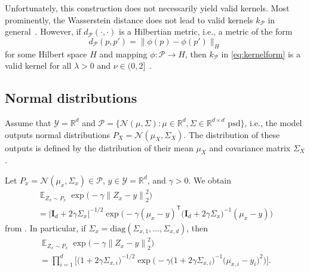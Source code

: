 \documentclass{article}
\DeclareMathOperator{\Exp}{\mathbb{E}}
\begin{document}
Unfortunately, this construction does not necessarily yield valid kernels.
Most prominently, the Wasserstein distance does not lead to valid kernels $k_{\mathcal{P}}$ in general~\citep[Chapter~8.3]{Peyre2018}. However, if $d_{\mathcal{P}}(\cdot, \cdot)$
is a Hilbertian metric, i.e., a metric of the form
\begin{equation*}
    d_{\mathcal{P}}(p, p') = \big\|\phi(p) - \phi(p') \big\|_{H}
\end{equation*}
for some Hilbert space $H$ and mapping $\phi \colon \mathcal{P} \to H$, then
$k_{\mathcal{P}}$ in \cref{eq:kernelform} is a valid kernel for all $\lambda > 0$ and
$\nu \in (0, 2]$~\citep[Corollary~3.3.3, Proposition~3.2.7]{Berg1984}.

\subsection{Normal distributions}
\label{app:normal}

Assume that $\mathcal{Y} = \mathbb{R}^d$ and
$\mathcal{P} = \{\mathcal{N}(\mu, \Sigma) \colon \mu \in \mathbb{R}^d, \Sigma \in \mathbb{R}^{d \times d} \text{ psd}\}$,
i.e., the model outputs normal distributions
$P_X = \mathcal{N}(\mu_X, \Sigma_X)$.
The distribution of these outputs is defined by the distribution
of their mean $\mu_X$ and covariance matrix $\Sigma_X$.

Let $P_x = \mathcal{N}(\mu_x, \Sigma_x) \in \mathcal{P}$,
$y \in \mathcal{Y} = \mathbb{R}^d$, and $\gamma > 0$. We obtain
\begin{multline*}
    \Exp_{Z_x \sim P_x} \exp{\Big(- \gamma {\|Z_x - y\|}^2_2\Big)} \\
    = {\big|\mathbf{I}_{d} + 2\gamma \Sigma_x \big|}^{-1/2} \exp{\Big(-\gamma {(\mu_x - y)}^{\mathsf{T}} {\big(\mathbf{I}_d + 2\gamma \Sigma_x
    \big)}^{-1} {(\mu_x - y)}\Big)}
\end{multline*}
from \citet[Theorem~3.2.a.3]{mathai1992}. In particular, if
$\Sigma_x = \mathrm{diag}{(\Sigma_{x,1}, \ldots, \Sigma_{x,d})}$, then
\begin{multline*}
    \Exp_{Z_x \sim P_x} \exp{\Big(- \gamma {\|Z_x - y\|}^2_2\Big)} \\
    = \prod_{i=1}^{d} \bigg[{\big(1 + 2\gamma \Sigma_{x,i}\big)}^{-1/2} \exp{\Big(-\gamma {\big(1 + 2\gamma \Sigma_{x,i}\big)}^{-1} {\big(\mu_{x,i} - y_i\big)}^2 \Big)}\bigg].
\end{multline*}
\end{document}
